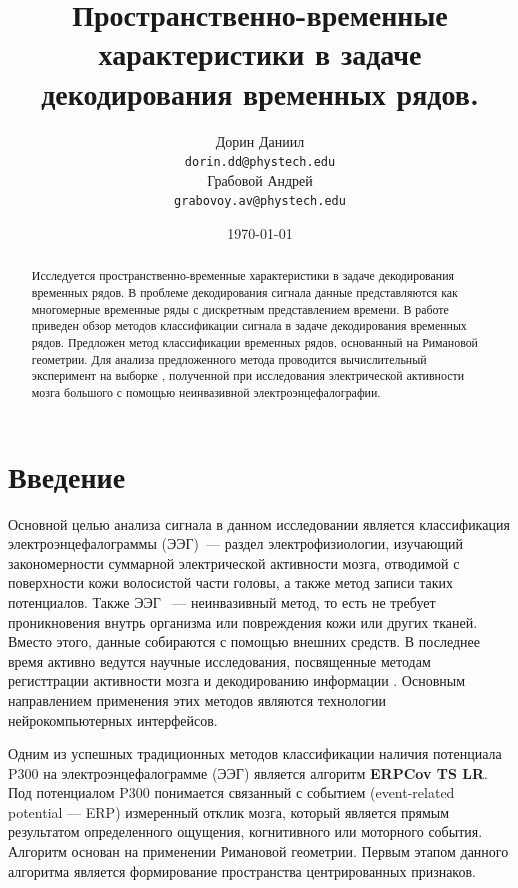 \documentclass[a4paper, 12pt]{extarticle}
\title{Пространственно-временные характеристики в задаче декодирования временных рядов.}
\author{
	Дорин Даниил \\
	\texttt{dorin.dd@phystech.edu} \\
	\And
	Грабовой Андрей \\
	\texttt{grabovoy.av@phystech.edu}
}
\date{\today}
\begin{document}
\maketitle

\begin{abstract}

	Исследуется пространственно-временные характеристики в задаче декодирования временных рядов. В проблеме декодирования 
	сигнала данные представляются как многомерные временные ряды с дискретным представлением времени. 
	В работе приведен обзор методов классификации сигнала в задаче декодирования временных рядов.
    Предложен метод классификации временных рядов, основанный на Римановой геометрии.
	Для анализа предложенного метода проводится вычислительный эксперимент на
	выборке \citep{misc_eeg_eye_state_264}, полученной при исследования электрической активности мозга большого с помощью неинвазивной электроэнцефалографии.

\end{abstract}


\section{Введение}
Основной целью анализа сигнала в данном исследовании является 
классификация электроэнцефалограммы (ЭЭГ)\citep{teplan2002fundamentals, beniczky2020electroencephalography}~--- раздел электрофизиологии, 
изучающий закономерности суммарной электрической активности мозга, 
отводимой с поверхности кожи волосистой части головы, 
а также метод записи таких потенциалов. Также ЭЭГ ~--- неинвазивный метод, то есть 
не требует проникновения внутрь организма или повреждения кожи или других тканей. 
Вместо этого, данные собираются с помощью внешних средств. 
В последнее время активно ведутся научные исследования, 
посвященные методам регисттрации активности мозга и декодированию 
информации \citep{siuly2016eeg, craik2019deep}. Основным направлением применения 
этих методов являются технологии нейрокомпьютерных интерфейсов.

Одним из успешных традиционных методов классификации наличия потенциала P300 на электроэнцефалограмме (ЭЭГ) является
алгоритм \textbf{ERPCov TS LR}. Под потенциалом P300 понимается связанный с 
событием (event-related potential — ERP) измеренный отклик мозга, 
который является прямым результатом определенного ощущения, 
когнитивного или моторного события.
Алгоритм основан на применении Римановой геометрии\citep{barachant2010riemannian}. 
Первым этапом данного алгоритма является формирование пространства центрированных признаков.
\end{document}
